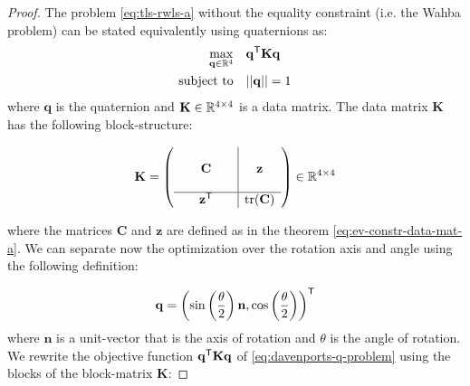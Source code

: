 \begin{proof}
	
	The problem \ref{eq:tls-rwls-a} without the equality constraint (i.e. the Wahba problem) can be stated equivalently using quaternions as:
	\begin{equation}
		\label{eq:davenports-q-problem}
		\begin{aligned}
			\max_{\mathbf{q} \in \mathbb{R}^4} &\quad \mathbf{q}^{\mathsf{T}} \mathbf{K} \mathbf{q}\\
			\text{subject to} &\quad  ||\mathbf{q}|| = 1
		\end{aligned}
	\end{equation}
	where $\mathbf{q}$ is the quaternion and $\mathbf{K} \in \mathbb{R}^{4\times4}$ is a data matrix.
	The data matrix $\mathbf{K}$ has the following block-structure:
	
	\begin{equation}
		\label{eq:k-mat}
		\begin{aligned}
			\mathbf{K} = \left(
			\begin{array}{c|c}
				\begin{array}{ccc}
					& & \\
					& \mathbf{C} & \\
					& & 
				\end{array}
				&
				\begin{array}{c}
					\mathbf{z} \\
				\end{array}
				\\
				\hline
				\begin{array}{ccc}
					& \mathbf{z}^{\mathsf{T}} &
				\end{array}
				&
				\textrm{tr}(\mathbf{C})
			\end{array}
			\right) \in \mathbb{R}^{4 \times 4}
		\end{aligned}
	\end{equation}
	
	where the matrices $\mathbf{C}$ and $\mathbf{z}$ are defined as in the theorem \ref{eq:ev-constr-data-mat-a}. 
	We can separate now the optimization over the rotation axis and angle using the following definition:
	
	\begin{equation}
		\label{eq:q-axis-angle}
		\begin{aligned}
			\mathbf{q} = \left( \sin \left( \frac{\theta}{2} \right) \mathbf{n}, \cos \left(\frac{\theta}{2} \right) \right)^{\mathsf{T}}
		\end{aligned}
	\end{equation}
	where $\mathbf{n}$ is a unit-vector that is the axis of rotation and $\theta$ is the angle of rotation.
	We rewrite the objective function $\mathbf{q}^{\mathsf{T}} \mathbf{K} \mathbf{q}$  of \ref{eq:davenports-q-problem} using the blocks of the block-matrix $\mathbf{K}$: 
	

\end{proof}
